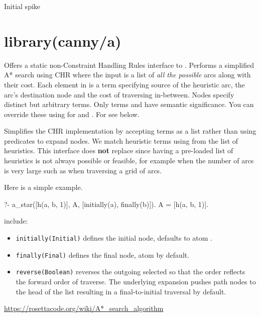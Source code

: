 \begin{shortlist}
    \item Initial spike
\end{shortlist}

\chapter{library(canny/a)}\label{sec:a}

\begin{description}
Offers a static non-Constraint Handling Rules interface to .
Performs a simplified A* search using CHR where the input is a list
of \textit{all the possible} arcs along with their cost. Each element in
 is a  term specifying source of the heuristic arc,
the arc's destination node and the cost of traversing in-between.
Nodes specify distinct but arbitrary terms. Only terms  and
 have semantic significance. You can override these using
 for  and . For  see below.

Simplifies the CHR implementation by accepting  terms as a list
rather than using predicates to expand nodes. We match heuristic
terms using  from the list of heuristics. This interface does
\textbf{not} replace  since having a pre-loaded list of
heuristics is not always possible or feasible, for example when the
number of arcs is very large such as when traversing a grid of arcs.

Here is a simple example.

\begin{code}
?- a_star([h(a, b, 1)], A, [initially(a), finally(b)]).
A = [h(a, b, 1)].
\end{code}

 include:

\begin{itemize}
    \item \verb$initially(Initial)$ defines the initial node, defaults to
atom .
    \item \verb$finally(Final)$ defines the final node, atom  by default.
    \item \verb$reverse(Boolean)$ reverses the outgoing selected  so that
the order reflects the forward order of traverse. The underlying
expansion pushes path nodes to the head of the list resulting in a
final-to-initial traversal by default.
\end{itemize}

\begin{tags}
\url{https://rosettacode.org/wiki/A*_search_algorithm}
\end{tags}
\end{description}

